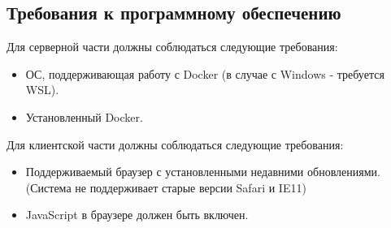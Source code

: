 \documentclass[requirements.tex]{subfiles}
\begin{document}
\subsection{Требования к программному обеспечению}
\par
Для серверной части должны соблюдаться следующие требования: 
\begin{itemize}
    \item ОС, поддерживающая работу с Docker (в случае с Windows - требуется WSL).
    \item Установленный Docker.
\end{itemize}
\par
Для клиентской части должны соблюдаться следующие требования:
\begin{itemize}
    \item Поддерживаемый браузер с установленными недавними обновлениями. (Система не поддерживает старые версии Safari и IE11)
    \item JavaScript в браузере должен быть включен.
\end{itemize}
\end{document}
